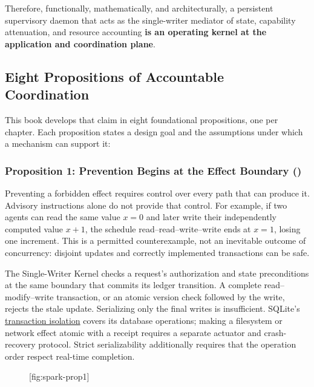 Therefore, functionally, mathematically, and architecturally, a persistent supervisory daemon that acts as the single-writer mediator of state, capability attenuation, and resource accounting \textbf{is an operating kernel at the application and coordination plane}.

\subsection{Eight Propositions of Accountable Coordination}

This book develops that claim in eight foundational propositions, one per chapter. Each proposition states a design goal and the assumptions under which a mechanism can support it:

\subsubsection*{Proposition 1: Prevention Begins at the Effect Boundary ()}
Preventing a forbidden effect requires control over every path that can produce it. Advisory instructions alone do not provide that control. For example, if two agents can read the same value $x=0$ and later write their independently computed value $x+1$, the schedule read--read--write--write ends at $x=1$, losing one increment. This is a permitted counterexample, not an inevitable outcome of concurrency: disjoint updates and correctly implemented transactions can be safe.

The Single-Writer Kernel checks a request's authorization and state preconditions at the same boundary that commits its ledger transition. A complete read--modify--write transaction, or an atomic version check followed by the write, rejects the stale update. Serializing only the final writes is insufficient. SQLite's \href{https://www.sqlite.org/isolation.html}{transaction isolation} covers its database operations; making a filesystem or network effect atomic with a receipt requires a separate actuator and crash-recovery protocol. Strict serializability additionally requires that the operation order respect real-time completion.

\begin{figure}[tp]
  \centering
  [fig:spark-prop1]
\end{figure}


